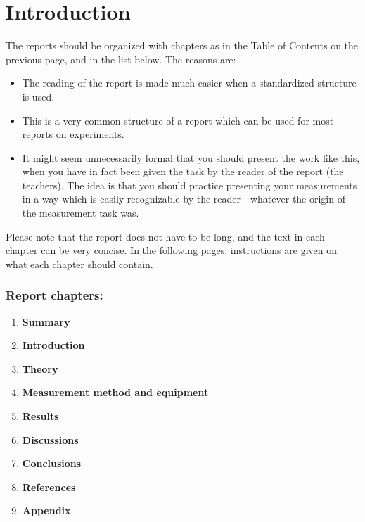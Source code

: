 \chapter{Introduction}

The reports should be organized with chapters as in the Table of Contents on the previous page, and in the list below. The reasons are: 
\begin{itemize}
\item The reading of the report is made much easier when a standardized structure is used. 
\item This is a very common structure of a report which can be used for most reports on experiments. 
\item It might seem unnecessarily formal that you should present the work like this, when you have in fact been given the task by the reader of the report (the teachers). The idea is that you should practice presenting your measurements in a way which is easily recognizable by the reader - whatever the origin of the measurement task was. 
\end{itemize}
Please note that the report does not have to be long, and the text in each chapter can be very concise. In the following pages, instructions are given on what each chapter should contain.\\

\subsection*{Report chapters: }

\begin{enumerate}
\item \textbf{Summary}
\item \textbf{Introduction} 
\item \textbf{Theory} 
\item \textbf{Measurement method and equipment} 
\item \textbf{Results} 
\item \textbf{Discussions} 
\item \textbf{Conclusions} 
\item \textbf{References}
\item \textbf{Appendix} 
\end{enumerate}

